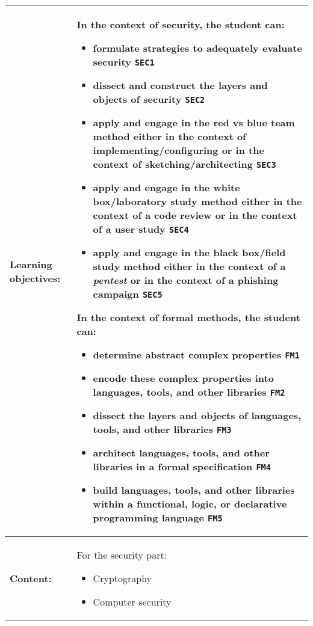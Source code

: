 \begin{tabularx}{\textwidth}{|>{\columncolor{lichtGrijs}} p{}|X|}
	\hline
	\textbf{Learning objectives:} &
	In the context of security, the student can:
	\begin{itemize}
		\item formulate strategies to adequately evaluate security \texttt{SEC1}
		\item dissect and construct the layers and objects of security \texttt{SEC2}
		\item apply and engage in the red vs blue team method either in the context of implementing/configuring or in the context of sketching/architecting \texttt{SEC3}
		\item apply and engage in the white box/laboratory study method either in the context of a code review or in the context of a user study \texttt{SEC4}
		\item apply and engage in the black box/field study method either in the context of a \textit{pentest} or in the context of a phishing campaign \texttt{SEC5}
	\end{itemize}

	In the context of formal methods, the student can:
	\begin{itemize}
		\item determine abstract complex properties \texttt{FM1}
		\item encode these complex properties into languages, tools, and other libraries \texttt{FM2}
		\item dissect the layers and objects of languages, tools, and other libraries \texttt{FM3}
		\item architect languages, tools, and other libraries in a formal specification \texttt{FM4}
		\item build languages, tools, and other libraries within a functional, logic, or declarative programming language \texttt{FM5}
	\end{itemize} \\
	\hline
	\textbf{Content:} &
	For the security part:
	\begin{itemize}
	\itemsep1pt\parskip0pt\parsep0pt
	\item
	  Cryptography
	\end{itemize}

	\begin{itemize}
	\itemsep1pt\parskip0pt\parsep0pt
	\item
	  Computer security
	\end{itemize}


\end{tabularx}
